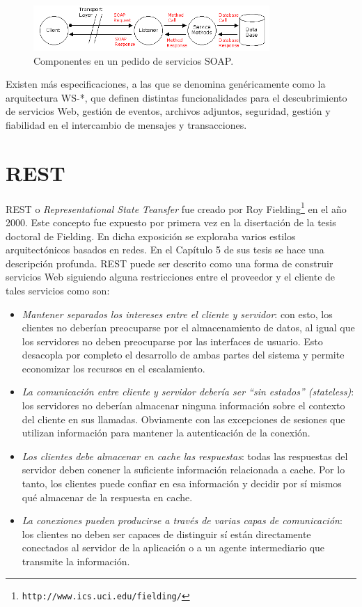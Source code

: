 \documentclass[conference]{IEEEtran}
\begin{document}
\begin{figure}[!t]
\centering
  \includegraphics[width=0.8\textwidth]{img/soap-comp}
  \caption{Componentes en un pedido de servicios SOAP.}
  \label{fig:soap-comp}
\end{figure}

Existen más especificaciones, a las que se denomina genéricamente como
la arquitectura WS-*, que definen distintas funcionalidades para el
descubrimiento de servicios Web, gestión de eventos, archivos
adjuntos, seguridad, gestión y fiabilidad en el intercambio de
mensajes y transacciones. 

\section{REST}
\label{sec:soap}

REST o \textsl{Representational State Teansfer} fue creado por Roy
Fielding\footnote{\texttt{http://www.ics.uci.edu/\texttildelow fielding/}} en el
año 2000. Este concepto fue expuesto por primera vez en la disertación
de la tesis doctoral de Fielding. En dicha exposición se exploraba
varios estilos arquitectónicos basados en redes. En el Capítulo 5
\cite{FieldingPhD} de sus tesis se hace una descripción profunda. REST
puede ser descrito como una forma de construir servicios Web siguiendo
alguna restricciones entre el proveedor y el cliente de tales
servicios como son\cite{NordicAPIs}:

\begin{itemize}
\item \emph{Mantener separados los intereses entre el cliente y
    servidor}:
  con esto, los clientes no deberían preocuparse por el almacenamiento
  de datos, al igual que los servidores no deben preocuparse por las
  interfaces de usuario. Esto desacopla por completo el desarrollo de
  ambas partes del sistema y permite economizar los recursos en el
  escalamiento. 
\item \emph{La comunicación entre cliente y servidor debería ser ``sin
  estados'' (stateless)}:  los servidores no deberían almacenar
  ninguna información sobre el contexto del cliente en sus
  llamadas. Obviamente con las excepciones de sesiones que utilizan
  información para mantener la autenticación de la conexión.
\item \emph{Los clientes debe almacenar en cache  las respuestas}:
  todas las
  respuestas del servidor deben conener la suficiente información
  relacionada a cache. Por lo tanto, los clientes puede confiar en esa
  información y decidir por sí mismos qué almacenar de la respuesta en
  cache. 
\item \emph{La conexiones pueden producirse  a través de varias capas de
  comunicación}: los clientes no deben ser capaces de distinguir sí
  están directamente conectados al servidor de la aplicación o a un
  agente intermediario que transmite la información. 
\end{itemize}
\end{document}
